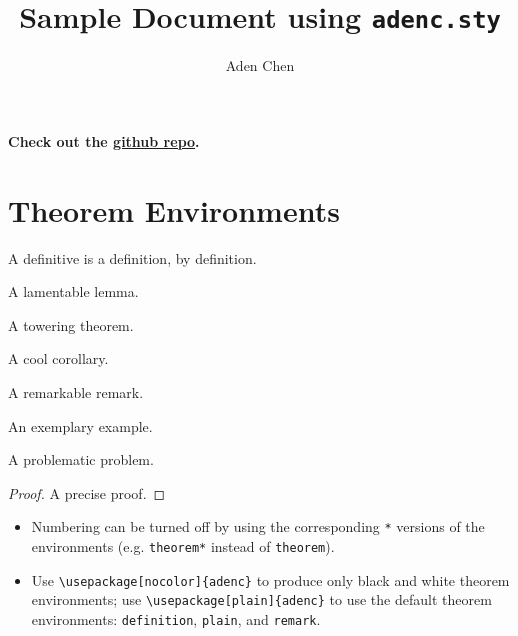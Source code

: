 \documentclass[10pt,letterpaper]{amsart}
\title{Sample Document using \texttt{adenc.sty}}
\author{Aden Chen}
\begin{document}
\maketitle

\tableofcontents

\noindent
\textbf{Check out the \href{https://github.com/AdenChen27/latex}{github repo}. }

\section{Theorem Environments}

\begin{definition}
  A definitive  is a definition, by definition. 
\end{definition}

\begin{lemma}
  A lamentable lemma. 
\end{lemma}

\begin{theorem}
  A towering theorem. 
\end{theorem}

\begin{corollary}
  A cool corollary. 
\end{corollary}

\begin{remark}
  A remarkable remark. 
\end{remark}

\begin{example}
  An exemplary example. 
\end{example}

\begin{problem}
  A problematic problem. 
\end{problem}

\begin{proof}
  A precise proof.
\end{proof}

\begin{itemize}
  \item Numbering can be turned off by using the corresponding \verb|*| versions of the environments (e.g. \verb|theorem*| instead of \verb|theorem|). 
  \item Use \verb|\usepackage[nocolor]{adenc}| to produce only black and white theorem environments; use \verb|\usepackage[plain]{adenc}|  to use the default theorem environments: \texttt{definition}, \texttt{plain}, and \texttt{remark}.
\end{itemize}
\end{document}

